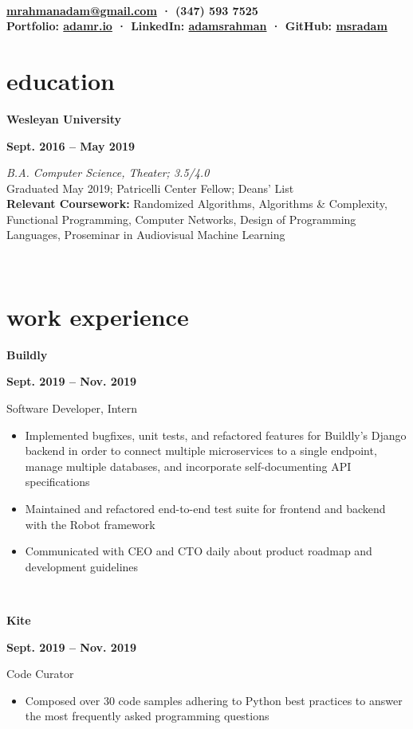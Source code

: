 \documentclass[letterpaper, 10.5pt]{article}
\author{Adam Rahman}
\makeatletter
\renewcommand{\maketitle}{
	\hspace{.125\textwidth}
	\begin{minipage}[t]{.75\textwidth}
    \begin{center}
        \fontsize{15pt}{15pt}\selectfont\bfseries \theauthor \\
        \fontsize{10pt}{15pt}\selectfont\sf
        \vspace{-0.5mm}
        \href{mailto:mrahmanadam@gmail.com}{mrahmanadam@gmail.com} · (347) 593 7525 \\
        \vspace{-0.5mm}
        Portfolio: \href{http://adamr.io}{adamr.io} · 
        LinkedIn: \href{https://www.linkedin.com/in/adamsrahman/}{adamsrahman} · 
        GitHub: \href{https://github.com/msradam}{msradam}  \\ 
        \end{center}
    \end{minipage}}
\newcommand{\eduentry}[4]{
        \begin{minipage}[b]{0.5\textwidth}
        \raggedright
        \bf\large #2
        \end{minipage}%
        \begin{minipage}[b]{0.5\textwidth}
        \raggedleft
        \bf #1
        \end{minipage}

    \begin{minipage}[t]{.80\linewidth}
    \vspace{-3mm}
    \textit{#3} \small{#4}
    \end{minipage}\\
    \vspace{1mm}
    }
\newcommand{\expentry}[5]{

    \begin{minipage}[b]{0.5\textwidth}
        \raggedright
        \bf\large #3
        \end{minipage}%
        \begin{minipage}[b]{0.5\textwidth}
        \raggedleft
        \bf {#1} -- {#2}
        \end{minipage}

    \begin{minipage}[t]{\linewidth}
    \vspace{-3mm}
    #4
    \vspace{-1.75mm}
    \small{#5}
    \end{minipage}\\
    \vspace{1mm}
    }
\makeatother
\begin{document}
    \maketitle
    \vspace{.075cm}


    \section{education}
    \eduentry{Sept. 2016 -- May 2019}
    {Wesleyan University}
    {B.A. Computer Science, Theater; 3.5/4.0}
    {\\ Graduated May 2019; Patricelli Center Fellow; Deans' List \\
    \textbf{Relevant Coursework:} Randomized Algorithms, Algorithms \& Complexity, Functional Programming, Computer Networks, Design of Programming Languages, Proseminar in Audiovisual Machine Learning}

    \section{work experience}
    \expentry{Sept. 2019}
    {Nov. 2019}
    {Buildly}
    {Software Developer, Intern}
    {
        \begin{itemize}
          \setlength\itemsep{-0.5mm}
          \item Implemented bugfixes, unit tests, and refactored features for Buildly's Django backend in order to connect multiple microservices to a single endpoint, manage multiple databases, and incorporate self-documenting API specifications
          \item Maintained and refactored end-to-end test suite for frontend and backend with the Robot framework
          \item Communicated with CEO and CTO daily about product roadmap and development guidelines
        \end{itemize}
        
    }

    \expentry{Sept. 2019}
    {Nov. 2019}
    {Kite}
    {Code Curator}
    {
        \begin{itemize}
          \setlength\itemsep{-0.5mm}
          \item Composed over 30 code samples adhering to Python best practices to answer the most frequently asked programming questions
         \end{itemize}
        
    }
\end{document}
